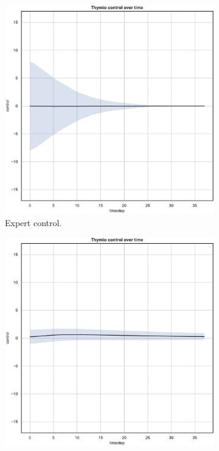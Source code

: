 \begin{figure}[H]
	\begin{center}
		\begin{subfigure}[h]{0.35\textwidth}
			\includegraphics[width=\textwidth]{contents/images/net-d15/control-overtime-omniscient}%
			\caption{Expert control.}
		\end{subfigure}
		\hspace{1cm}
		\begin{subfigure}[h]{0.35\textwidth}
			\includegraphics[width=\textwidth]{contents/images/net-d15/control-overtime-learned_distributed}

\end{subfigure}
\end{center}
\end{figure}
